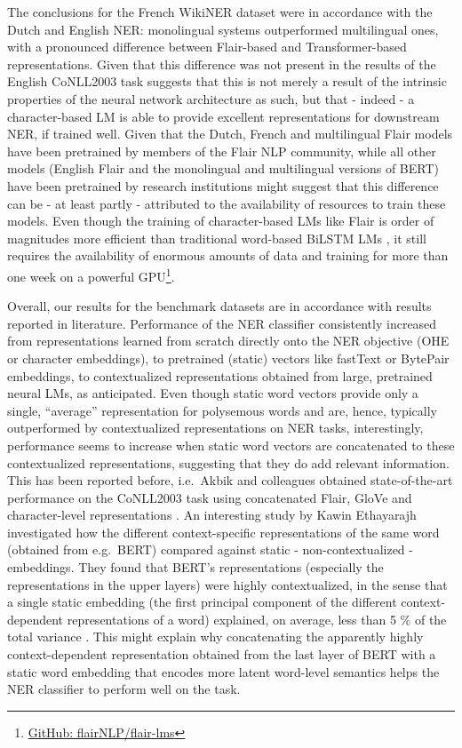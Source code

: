 \documentclass[12pt,a4paper,]{book}
\begin{document}
The conclusions for the French WikiNER dataset were in accordance with the Dutch and English NER: monolingual systems outperformed multilingual ones, with a pronounced difference between Flair-based and Transformer-based representations. Given that this difference was not present in the results of the English CoNLL2003 task suggests that this is not merely a result of the intrinsic properties of the neural network architecture as such, but that - indeed - a character-based LM is able to provide excellent representations for downstream NER, if trained well. Given that the Dutch, French and multilingual Flair models have been pretrained by members of the Flair NLP community, while all other models (English Flair and the monolingual and multilingual versions of BERT) have been pretrained by research institutions might suggest that this difference can be - at least partly - attributed to the availability of resources to train these models. Even though the training of character-based LMs like Flair is order of magnitudes more efficient than traditional word-based BiLSTM LMs \citep{akbik2018}, it still requires the availability of enormous amounts of data and training for more than one week on a powerful GPU\footnote{\href{https://github.com/flairNLP/flair-lms}{GitHub: flairNLP/flair-lms}}.

Overall, our results for the benchmark datasets are in accordance with results reported in literature. Performance of the NER classifier consistently increased from representations learned from scratch directly onto the NER objective (OHE or character embeddings), to pretrained (static) vectors like fastText or BytePair embeddings, to contextualized representations obtained from large, pretrained neural LMs, as anticipated. Even though static word vectors provide only a single, ``average'' representation for polysemous words and are, hence, typically outperformed by contextualized representations on NER tasks, interestingly, performance seems to increase when static word vectors are concatenated to these contextualized representations, suggesting that they do add relevant information. This has been reported before, i.e.~Akbik and colleagues obtained state-of-the-art performance on the CoNLL2003 task using concatenated Flair, GloVe and character-level representations \citep{akbik2018}. An interesting study by Kawin Ethayarajh investigated how the different context-specific representations of the same word (obtained from e.g.~BERT) compared against static - non-contextualized - embeddings. They found that BERT's representations (especially the representations in the upper layers) were highly contextualized, in the sense that a single static embedding (the first principal component of the different context-dependent representations of a word) explained, on average, less than 5 \% of the total variance \citep{ethayarajh2019}. This might explain why concatenating the apparently highly context-dependent representation obtained from the last layer of BERT with a static word embedding that encodes more latent word-level semantics helps the NER classifier to perform well on the task.
\end{document}
